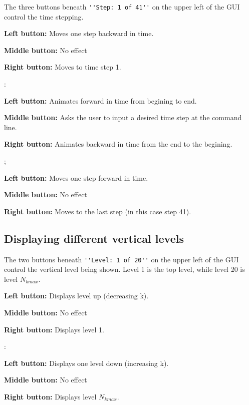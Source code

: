 The three buttons beneath \verb+''Step: 1 of 41''+ on the upper left of the GUI control the time stepping.
\begin{list}{}
\item \button{$<--$}
\begin{list}{}
\item {\bf Left button:} Moves one step backward in time.
\item {\bf Middle button:} No effect
\item {\bf Right button:} Moves to time step 1.
\end{list}
\item {}: 
\begin{list}{}
\item {\bf Left button:} Animates forward in time from begining to end.
\item {\bf Middle button:} Asks the user to input a desired time step at the command line.
\item {\bf Right button:} Animates backward in time from the end to the begining.
\end{list}
\item \button{$-->$};
\begin{list}{}
\item {\bf Left button:} Moves one step forward in time.
\item {\bf Middle button:} No effect
\item {\bf Right button:} Moves to the last step (in this case step 41).
\end{list}
\end{list}

\subsection{Displaying different vertical levels}

The two buttons beneath \verb+''Level: 1 of 20''+ on the upper left of the GUI control the vertical level
being shown.  Level 1 is the top level, while level 20 is level $N_{kmax}$.
\begin{list}{}
\item \button{$<--$}
\begin{list}{}
\item {\bf Left button:} Displays level up (decreasing k).
\item {\bf Middle button:} No effect
\item {\bf Right button:} Displays level 1.
\end{list}
\item \button{$-->$}:
\begin{list}{}
\item {\bf Left button:} Displays one level down (increasing k).
\item {\bf Middle button:} No effect
\item {\bf Right button:} Displays level $N_{kmax}$.
\end{list}
\end{list}

